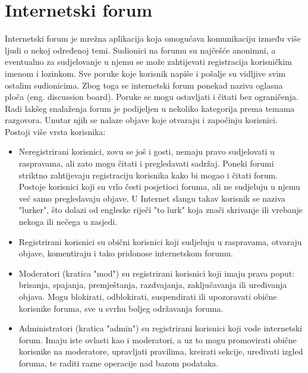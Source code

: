 \documentclass{foi}
\begin{document}
\section{Internetski forum}

Internetski forum je mrežna aplikacija koja omogućava komunikaciju između više ljudi o nekoj određenoj temi. Sudionici na forumu su najčešće anonimni, a eventualno za sudjelovanje u njemu se može zahtijevati registracija korisničkim imenom i lozinkom.  Sve poruke koje korisnik napiše i pošalje su vidljive svim ostalim sudionicima. \cite{definitionInternetForum} Zbog toga se internetski forum ponekad naziva oglasna ploča (eng. discussion board). Poruke se mogu ostavljati i čitati bez ograničenja. Radi lakšeg snalaženja forum je podijeljen u nekoliko kategorija prema temama razgovora. Unutar njih se nalaze objave koje otvaraju i započinju korisnici. Postoji više vrsta korisnika:

\begin{itemize}
\item Neregistrirani korisnici, zovu se još i gosti, nemaju pravo sudjelovati u raspravama, ali zato mogu čitati i pregledavati sadržaj. Poneki forumi striktno zahtijevaju registraciju korisnika kako bi mogao i čitati forum. Postoje korisnici koji su vrlo česti posjetioci foruma, ali ne sudjeluju u njemu već samo pregledavaju objave. U Internet slangu takav korisnik se naziva "lurker", što dolazi od engleske riječi "to lurk" koja znači skrivanje ili vrebanje nekoga ili nečega u zasjedi.\cite{lurker}
\item Registrirani korisnici su obični korisnici koji sudjeluju u raspravama, otvaraju objave, komentiraju i tako pridonose internetskom forumu.
\item Moderatori (kratica "mod") su registrirani korisnici koji imaju prava poput: brisanja, spajanja, premještanja, razdvajanja, zaključavanja ili uređivanja objava. Mogu blokirati, odblokirati, suspendirati ili upozoravati obične korisnike foruma, sve u svrhu boljeg održavanja foruma.
\item Administratori (kratica "admin") su registrirani korisnici koji vode internetski forum. Imaju iste ovlasti kao i moderatori, a uz to mogu promovirati obične korisnike na moderatore, upravljati pravilima, kreirati sekcije, uređivati izgled foruma, te raditi razne operacije nad bazom podataka.\cite{adminvsmoderator}
\end{itemize}
\end{document}
